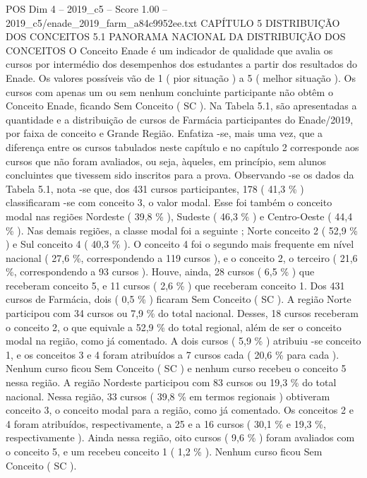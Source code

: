 \begin{textsample}{POS Dim 4 – 2019\_c5 – Score 1.00 – 2019\_c5/enade\_2019\_farm\_a84c9952ee.txt}  \label{ex:f4_pos_193}
CAPÍTULO 5 DISTRIBUIÇÃO DOS CONCEITOS 5.1 PANORAMA NACIONAL DA DISTRIBUIÇÃO DOS CONCEITOS O Conceito Enade é um indicador de qualidade que avalia os cursos por intermédio dos desempenhos dos estudantes a partir dos resultados do Enade.
Os valores possíveis vão de 1 ( pior situação ) a 5 ( melhor situação ).
Os cursos com apenas um ou sem nenhum concluinte participante não obtêm o Conceito Enade, ficando Sem Conceito ( SC ).
Na Tabela 5.1, são apresentadas a quantidade e a distribuição de cursos de Farmácia participantes do Enade/2019, por faixa de conceito e Grande Região.
Enfatiza -se, mais uma vez, que a diferença entre os cursos tabulados neste capítulo e no capítulo 2 corresponde aos cursos que não foram avaliados, ou seja, àqueles, em princípio, sem alunos concluintes que tivessem sido inscritos para a prova.
Observando -se os dados da Tabela 5.1, nota -se que, dos 431 cursos participantes, 178 ( 41,3 \% ) classificaram -se com conceito 3, o valor modal.
Esse foi também o conceito modal nas regiões Nordeste ( 39,8 \% ), Sudeste ( 46,3 \% ) e Centro-Oeste ( 44,4 \% ).
Nas demais regiões, a classe modal foi a seguinte ; Norte conceito 2 ( 52,9 \% ) e Sul conceito 4 ( 40,3 \% ).
O conceito 4 foi o segundo mais frequente em nível nacional ( 27,6 \%, correspondendo a 119 cursos ), e o conceito 2, o terceiro ( 21,6 \%, correspondendo a 93 cursos ).
Houve, ainda, 28 cursos ( 6,5 \% ) que receberam conceito 5, e 11 cursos ( 2,6 \% ) que receberam conceito 1.
Dos 431 cursos de Farmácia, dois ( 0,5 \% ) ficaram Sem Conceito ( SC ).
A região Norte participou com 34 cursos ou 7,9 \% do total nacional.
Desses, 18 cursos receberam o conceito 2, o que equivale a 52,9 \% do total regional, além de ser o conceito modal na região, como já comentado.
A dois cursos ( 5,9 \% ) atribuiu -se conceito 1, e os conceitos 3 e 4 foram atribuídos a 7 cursos cada ( 20,6 \% para cada ).
Nenhum curso ficou Sem Conceito ( SC ) e nenhum curso recebeu o conceito 5 nessa região.
A região Nordeste participou com 83 cursos ou 19,3 \% do total nacional.
Nessa região, 33 cursos ( 39,8 \% em termos regionais ) obtiveram conceito 3, o conceito modal para a região, como já comentado.
Os conceitos 2 e 4 foram atribuídos, respectivamente, a 25 e a 16 cursos ( 30,1 \% e 19,3 \%, respectivamente ).
Ainda nessa região, oito cursos ( 9,6 \% ) foram avaliados com o conceito 5, e um recebeu conceito 1 ( 1,2 \% ).
Nenhum curso ficou Sem Conceito ( SC ).

\end{textsample}

